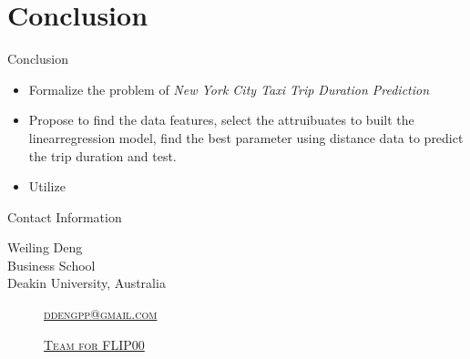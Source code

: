 \documentclass[
 size=14pt,
 paper=smartboard,  %
 mode=present, 		%
 display=slides, 	%
 style=tuliplab,  	%
 pauseslide,
 fleqn,leqno]{powerdot}
\begin{document}
\section{Conclusion}

\begin{slide}[toc=,bm=]{Conclusion}
\begin{itemize}
\item
\smallskip
Formalize the problem of \emph{New York City Taxi Trip Duration Prediction} 

\item
\smallskip
Propose to find the data features, select the attruibuates to built the linearregression model, find the best parameter using distance data to predict the trip duration and test.

\item
\smallskip
Utilize 

\end{itemize}



\end{slide}
\begin{wideslide}[toc=,bm=]{Contact Information}
\centering
{}
\twocolumn[
lcolwidth=0.35\linewidth,
rcolwidth=0.65\linewidth
]
{
}
{
Weiling Deng\\
Business School\\
Deakin University, Australia
\begin{description}
 \item[\textcolor{orange}{\faEnvelope}] \href{ddengpp@gmail.com}
 {\textsc{\footnotesize{ddengpp@gmail.com}}}

 \item[\textcolor{orange}{\faHome}] \href{http://www.tulip.org.au}
 {\textsc{\footnotesize{Team for FLIP00}}}
\end{description}
}
\end{wideslide}
\end{document}
